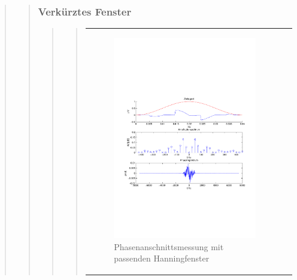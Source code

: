 \begin{quote}
\begin{quote}
        \subsubsection{Verkürztes Fenster }

		\begin{quote}
			         

		\begin{quote}        
                \begin{center}
                \begin{tabular}{ll}
    
                \hspace{-11em}
                    \begin{minipage}{0.6\textwidth}
    
                        \begin{figure}[H]
                            \label{fig:}
                            \includegraphics[scale=0.4, trim = 1.5cm 7cm 1.5cm 8cm,
                            clip]{./Bilder/Phasenanschnittsmessungmithanningfenster} %
                            \caption{Phasenanschnittsmessung mit passenden Hanningfenster}
                        \end{figure}
    

\end{minipage}
\end{tabular}
\end{center}
\end{quote}
\end{quote}
\end{quote}
\end{quote}
